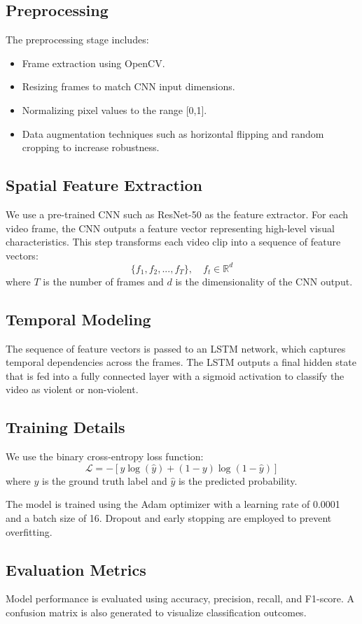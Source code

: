 \documentclass[conference]{IEEEtran}
\begin{document}
\subsection{Preprocessing}
The preprocessing stage includes:
\begin{itemize}
    \item Frame extraction using OpenCV.
    \item Resizing frames to match CNN input dimensions.
    \item Normalizing pixel values to the range [0,1].
    \item Data augmentation techniques such as horizontal flipping and random cropping to increase robustness.
\end{itemize}

\subsection{Spatial Feature Extraction}
We use a pre-trained CNN such as ResNet-50 as the feature extractor. For each video frame, the CNN outputs a feature vector representing high-level visual characteristics. This step transforms each video clip into a sequence of feature vectors:
\[
\{f_1, f_2, ..., f_T\}, \quad f_t \in \mathbb{R}^d
\]
where $T$ is the number of frames and $d$ is the dimensionality of the CNN output.

\subsection{Temporal Modeling}
The sequence of feature vectors is passed to an LSTM network, which captures temporal dependencies across the frames. The LSTM outputs a final hidden state that is fed into a fully connected layer with a sigmoid activation to classify the video as violent or non-violent.

\subsection{Training Details}
We use the binary cross-entropy loss function:
\[
\mathcal{L} = -[y \log(\hat{y}) + (1 - y)\log(1 - \hat{y})]
\]
where $y$ is the ground truth label and $\hat{y}$ is the predicted probability.

The model is trained using the Adam optimizer with a learning rate of 0.0001 and a batch size of 16. Dropout and early stopping are employed to prevent overfitting.

\subsection{Evaluation Metrics}
Model performance is evaluated using accuracy, precision, recall, and F1-score. A confusion matrix is also generated to visualize classification outcomes.



\end{document}
